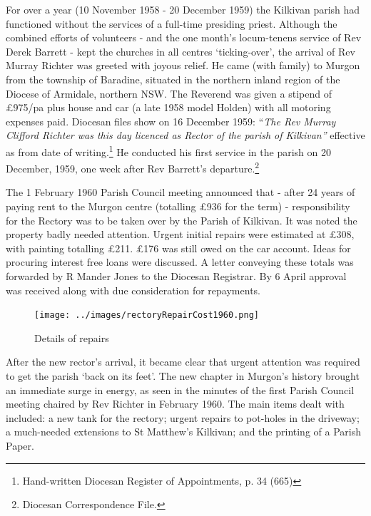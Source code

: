For over a year (10 November 1958 - 20 December 1959) the Kilkivan parish had functioned without the services of a full-time presiding priest. Although the combined efforts of volunteers - and the one month's locum-tenens service of Rev Derek Barrett - kept the churches in all centres `ticking-over', the arrival of Rev Murray Richter was greeted with joyous relief. He came (with family) to Murgon from the township of Baradine, situated in the northern inland region of the Diocese of Armidale, northern NSW. The Reverend was given a stipend of \pounds975/pa plus house and car (a late 1958 model Holden) with all motoring expenses paid. Diocesan files show on 16 December 1959: ``\emph{The Rev Murray Clifford Richter was this day licenced as Rector of the parish of Kilkivan''} effective as from date of writing.\footnote{Hand-written Diocesan Register of Appointments, p. 34 (665)} He conducted his first service in the parish on 20 December, 1959, one week after Rev Barrett's departure.\footnote{Diocesan Correspondence File.}


The 1 February 1960 Parish Council meeting announced that - after 24 years of paying rent to the Murgon centre (totalling \pounds936 for the term) - responsibility for the Rectory was to be taken over by the Parish of Kilkivan. It was noted the property badly needed attention. Urgent initial repairs were estimated at \pounds308, with painting totalling \pounds211. \pounds176 was still owed on the car account. Ideas for procuring interest free loans were discussed. A letter conveying these totals was forwarded by R Mander Jones to the Diocesan Registrar. By 6 April approval was received along with due consideration for repayments.









\begin{figure}[!htb]
\begin{center}
\texttt{[image: ../images/rectoryRepairCost1960.png]}
\caption{Details of repairs}
\end{center}
\end{figure}




After the new rector's arrival, it became clear that urgent attention was required to get the parish `back on its feet'. The new chapter in Murgon's history brought an immediate surge in energy, as seen in the minutes of the first Parish Council meeting chaired by Rev Richter in February 1960. The main items dealt with included: a new tank for the rectory; urgent repairs to pot-holes in the driveway; a much-needed extensions to St Matthew's Kilkivan; and the printing of a Parish Paper.



